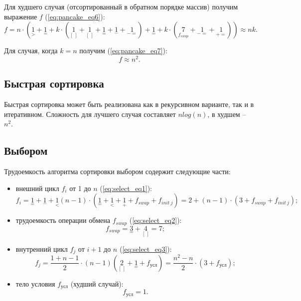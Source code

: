 \begin{itemize}
Для худшего случая (отсортированный в обратном порядке массив) получим выражение $f$ (\ref{eq:pancake_eq6}):
\begin{equation}
	\label{eq:pancake_eq6}
	f = n \cdot({\underset{>}{1}} + {\underset{=}{1}} + k \cdot ({\underset{[\ ]}{1}} + {\underset{[\ ]}{1}} + {\underset{=}{1}} + {\underset{-}{1}} + {\underset{-=}{1}}) + {\underset{=}{1}} + k \cdot ({\underset{f_{swap}}{7}} + {\underset{-=}{1}} + {\underset{+=}{1}})) \approx nk.
\end{equation}

Для случая, когда $k = n$ получим (\ref{eq:pancake_eq7}):
\begin{equation}
	\label{eq:pancake_eq7}
	f \approx n^2.
\end{equation}

\end{itemize}
\subsection{Быстрая сортировка}
Быстрая сортировка может быть реализована как в рекурсивном варианте, так и в итеративном. Сложность для лучшего случая составляет $n log(n)$, в худшем -- $n^2$.
\subsection{Выбором}
Трудоемкость алгоритма сортировки выбором содержит следующие части:
\begin{itemize}
	\item внешний цикл $f_i$ от 1 до $n$ (\ref{eq:select_eq1}):
	\begin{equation}
		\label{eq:select_eq1}
		f_i = {\underset{=}{1}} + {\underset{-}{1}} + {\underset{<}{1}}(n - 1)\cdot({\underset{=}{1}} + {\underset{<}{1}} + {\underset{+}{1}} + f_{swap} + f_{init\ j}) = 2 + (n - 1)\cdot(3 + f_{swap} + f_{init\ j});
	\end{equation}
	\item трудоемкость операции обмена $f_{swap}$ (\ref{eq:select_eq2}): 
	\begin{equation}
		\label{eq:select_eq2}
		f_{swap} = {\underset{=}{3}} + {\underset{[\ ]}{4}} = 7;
	\end{equation}
	\item внутренний цикл $f_j$ от $i+1$ до $n$ (\ref{eq:select_eq3}):
	\begin{equation}
		\label{eq:select_eq3}
		f_j = \frac{1 + n - 1}{2} \cdot (n -1) ({\underset{[\ ]}{2} + {\underset{=}{1}}} + f_{\text{усл}}) = \frac{n^2 - n}{2} \cdot(3 + f_{\text{усл}});
	\end{equation} 
	\item тело условия $f_{\text{усл}}$ (худший случай):
	\begin{equation}
		f_{\text{усл}} = 1.
	\end{equation}
	
\end{itemize}


